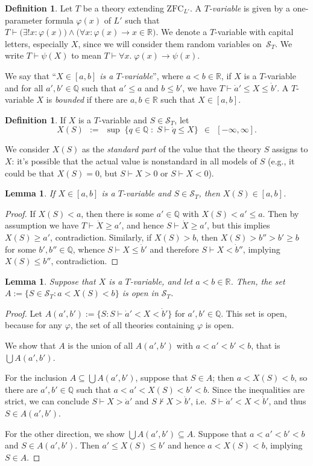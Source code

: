 \documentclass[12pt]{article}
\newcommand{\vp}{\varphi}
\newcommand{\RR}{\mathbb{R}}
\newcommand{\QQ}{\mathbb{Q}}
\newcommand{\zfc}{\mathrm{ZFC}}
\newcommand{\zfcl}{{\zfc_{\cL}}}
\newcommand{\cL}{L'}
\newcommand{\cS}{\mathcal{S}}
\newcommand{\inClosed}[1]{#1 \in [a, b]}
\newcommand{\Tvar}{$T$-variable}
\theoremstyle{plain}
\newtheorem{lemma}[theorem]{Lemma}
\theoremstyle{definition}
\newtheorem{definition}[theorem]{Definition}
\theoremstyle{remark}
\begin{document}
\begin{definition}
Let $T$ be a theory extending $\zfcl$. 
A \emph{\Tvar{}}
is given by a one-parameter formula $\vp(x)$ of $\cL$ such that $T\vdash\big(\exists!x:\vp(x)\big)\wedge\big(\forall x:\vp(x)\to x\in\RR\big)$. 
We denote a \Tvar{} with capital letters, especially $X$, since we will consider them random variables on~$\cS_T$.
We write $T\vdash\psi(X)$ to mean $T\vdash\forall x.\;\vp(x)\to\psi(x)$.

We say that ``\emph{$X\in[a,b]$ is a \Tvar{}}'', where $a<b\in\RR$, if $X$ is a \Tvar{} and for all $a',b'\in\QQ$ such that $a'\le a$ and $b\le b'$, we have $T\vdash\dot a'\le X\le \dot b'$.
A \Tvar{} $X$ is \emph{bounded} if there are $a,b\in\RR$ such that $\inClosed{X}$.
\end{definition}
\begin{definition}
If $X$ is a \Tvar{} and $S\in\cS_T$, let
\[X(S) \;\,:=\;\, \sup\;\{q\in\QQ \;:\; S\vdash \dot q \le X\} \;\,\in\;\, [-\infty,\infty].\]
\end{definition}
We consider $X(S)$ as the \emph{standard part} of the value that the theory $S$ assigns to $X$: it's possible that the actual value is nonstandard in all models of $S$ (e.g., it could be that $X(S) = 0$, but $S\vdash X>0$ or $S\vdash X<0$).
\begin{lemma}
If $X\in[a,b]$ is a \Tvar{} and $S\in\cS_T$, then $X(S)\in[a,b]$.
\end{lemma}
\begin{proof}
If $X(S) < a$, then there is some $a'\in\QQ$ with $X(S) < a' \le a$. 
Then by assumption we have $T\vdash\dot X\geq a'$, and hence $S\vdash\dot X\geq a'$, but this implies $X(S)\ge a'$, contradiction.
Similarly, if $X(S) > b$, then $X(S) > b'' > b' \ge b$ for some $b',b''\in\QQ$, whence $S\vdash X\le\dot b'$ and therefore $S\vdash X<\dot b''$, implying $X(S) \le b''$, contradiction.
\end{proof}
\begin{lemma}
Suppose that $X$ is a \Tvar{}, and let $a<b\in\RR$. Then, the set $A := \{S\in\cS_T : a< X(S)<b\}$ is open in $\cS_T$.
\end{lemma}
\begin{proof}
Let $A(a',b') := \{S : S\vdash\dot a' < X < \dot b'\}$ for $a',b'\in\QQ$. 
This set is open, because for any $\vp$, the set of all theories containing $\vp$ is open. 

We show that $A$ is the union of all $A(a',b')$ with $a < a' < b' < b$, that is $\bigcup A(a',b')$.

For the inclusion $A \subseteq \bigcup A(a',b')$, suppose that $S\in A$; then $a < X(S) < b$, so there are $a',b'\in\QQ$ such that $a<a'<X(S)<b'<b$.
Since the inequalities are strict, we can conclude $S\vdash X > \dot a'$ and $S\nvdash X > \dot b'$, i.e.\ $S\vdash\dot a' < X < \dot b'$, and thus $S\in A(a',b')$.

For the other direction, we show $\bigcup A(a',b')\subseteq A$. 
Suppose that $a < a' < b' < b$ and $S\in A(a',b')$.
Then $a' \le X(S) \le b'$ and hence $a < X(S) < b$, implying $S\in A$.
\end{proof}
\end{document}
